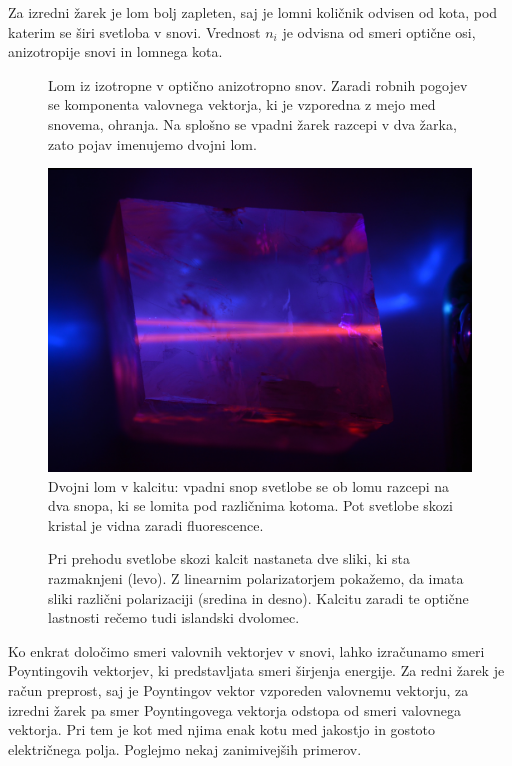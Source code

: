 Za izredni žarek je lom bolj zapleten, saj je lomni količnik odvisen od kota, pod
katerim se širi svetloba v snovi.
Vrednost $n_i$ je odvisna od smeri optične osi, anizotropije snovi in lomnega kota.
\begin{figure}[ht]
\centering
\def\svgwidth{75truemm} 

\caption{Lom iz izotropne v optično anizotropno snov. Zaradi robnih pogojev se
komponenta valovnega vektorja, ki je vzporedna z mejo med snovema, ohranja. Na splošno se 
vpadni žarek razcepi v dva žarka, zato pojav imenujemo dvojni lom.}
\label{fig:10_dvolom_1}
\end{figure}
\begin{figure}[ht]
\centering
\includegraphics[width=85truemm]{slike/10_FotoDvolom2.jpg}
\caption{Dvojni lom v kalcitu: vpadni snop svetlobe se ob lomu
razcepi na dva snopa, ki se lomita pod različnima kotoma.
Pot svetlobe skozi kristal je vidna zaradi fluorescence.}
\label{fig:10_dvolom_2}
\end{figure}
\begin{figure}[ht!]
\centering
\def\svgwidth{140truemm} 

\caption{Pri prehodu svetlobe skozi kalcit nastaneta dve sliki, ki sta razmaknjeni (levo). 
Z linearnim polarizatorjem pokažemo, da imata sliki različni polarizaciji (sredina in desno). 
Kalcitu zaradi te optične lastnosti rečemo tudi islandski dvolomec.
}
\label{fig:10_dvolom_2a}
\end{figure}

Ko enkrat določimo smeri valovnih vektorjev v snovi, lahko izračunamo
smeri Poyntingovih vektorjev, ki predstavljata smeri širjenja energije. Za redni 
žarek je račun preprost, saj je Poyntingov vektor vzporeden valovnemu vektorju, za 
izredni žarek pa smer Poyntingovega vektorja odstopa od smeri valovnega vektorja. Pri 
tem je kot med njima enak kotu med jakostjo in gostoto električnega polja. 
Poglejmo nekaj zanimivejših primerov.

